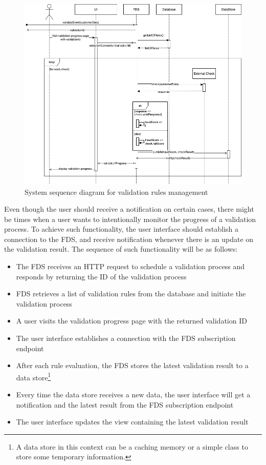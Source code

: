 \begin{figure}[!ht]
 \includegraphics[width=\textwidth]{diagrams/sequence-pubsub.png}
 \caption{System sequence diagram for validation rules management}
\end{figure}

Even though the user should receive a notification on certain cases, there might be times when a user wants to intentionally monitor the progress of a validation process. To achieve such functionality, the user interface should establish a connection to the FDS, and receive notification whenever there is an update on the validation result. The sequence of such functionality will be as follows:

\begin{itemize}
 \item The FDS receives an HTTP request to schedule a validation process and responds by returning the ID of the validation process
 \item FDS retrieves a list of validation rules from the database and initiate the validation process
 \item A user visits the validation progress page with the returned validation ID
 \item The user interface establishes a connection with the FDS subscription endpoint
 \item After each rule evaluation, the FDS stores the latest validation result to a data store\footnote{A data store in this context can be a caching memory or a simple class to store some temporary information.}
 \item Every time the data store receives a new data, the user interface will get a notification and the latest result from the FDS subscription endpoint
 \item The user interface updates the view containing the latest validation result
\end{itemize}

